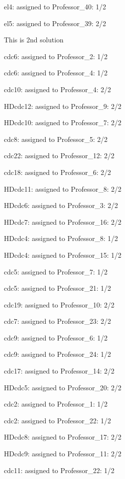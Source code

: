\documentclass{article} %
\begin{document}
\noindent el4: assigned to Professor\_40: 1/2

\noindent el5: assigned to Professor\_39: 2/2

\noindent 

\noindent  This is 2nd solution

\noindent cdc6: assigned to Professor\_2: 1/2

\noindent cdc6: assigned to Professor\_4: 1/2

\noindent cdc10: assigned to Professor\_4: 2/2

\noindent HDcdc12: assigned to Professor\_9: 2/2

\noindent HDcdc10: assigned to Professor\_7: 2/2

\noindent cdc8: assigned to Professor\_5: 2/2

\noindent cdc22: assigned to Professor\_12: 2/2

\noindent cdc18: assigned to Professor\_6: 2/2

\noindent HDcdc11: assigned to Professor\_8: 2/2

\noindent HDcdc6: assigned to Professor\_3: 2/2

\noindent HDcdc7: assigned to Professor\_16: 2/2

\noindent HDcdc4: assigned to Professor\_8: 1/2

\noindent HDcdc4: assigned to Professor\_15: 1/2

\noindent cdc5: assigned to Professor\_7: 1/2

\noindent cdc5: assigned to Professor\_21: 1/2

\noindent cdc19: assigned to Professor\_10: 2/2

\noindent cdc7: assigned to Professor\_23: 2/2

\noindent cdc9: assigned to Professor\_6: 1/2

\noindent cdc9: assigned to Professor\_24: 1/2

\noindent cdc17: assigned to Professor\_14: 2/2

\noindent HDcdc5: assigned to Professor\_20: 2/2

\noindent cdc2: assigned to Professor\_1: 1/2

\noindent cdc2: assigned to Professor\_22: 1/2

\noindent HDcdc8: assigned to Professor\_17: 2/2

\noindent HDcdc9: assigned to Professor\_11: 2/2

\noindent cdc11: assigned to Professor\_22: 1/2
\end{document}
